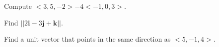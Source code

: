 \documentclass{exam}[12pt]
\begin{document}
\pagestyle{head}

\extraheadheight{.3in}
\extrafootheight{-.3in} 


\vspace{.2in}
\large{

\begin{questions}

\question Compute $<3,5,-2> - 4<-1,0,3>$.
\vspace{1in}

\question Find $||2\mathbf{i} -3\mathbf{j} +\mathbf{k}||$.
\vspace{1in}

\question Find a unit vector that points in the same direction as $<5,-1,4>$.



\end{questions}

}
\end{document}
